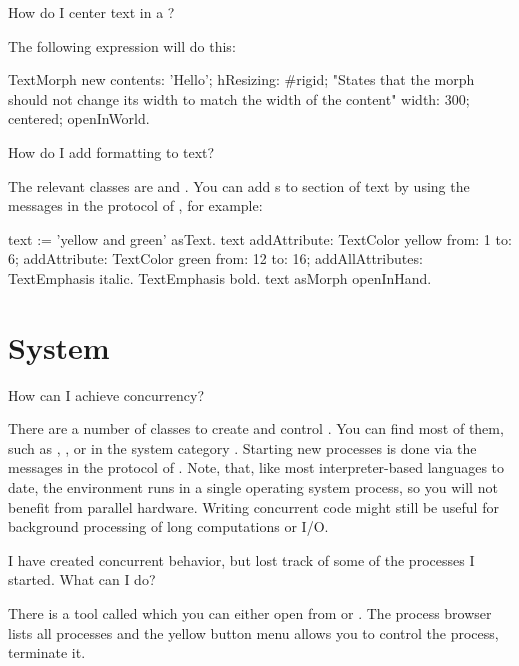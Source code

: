 \documentclass[a4paper,10pt,twoside]{book}
\begin{document}
\begin{faq}
How do I center text in a ?
\end{faq}
\answer
The following expression will do this:
\begin{code}{}
TextMorph new
    contents: 'Hello';
    hResizing: #rigid; "States that the morph should not change
                        its width to match the width of the content"
    width: 300;
    centered;
    openInWorld.
\end{code}

\begin{faq}
How do I add formatting to text?
\end{faq}
\answer
The relevant classes are  and .
You can add s to section of text by using the messages in the  protocol of , for example:
\begin{code}{}
text := 'yellow and green' asText.
text
	addAttribute: TextColor yellow from: 1 to: 6;
	addAttribute: TextColor green from: 12 to: 16;
	addAllAttributes: {TextEmphasis italic. TextEmphasis bold}.
text asMorph openInHand.
\end{code}

\section{System}

\begin{faq}
How can I achieve concurrency?
\end{faq}
\answer
There are a number of classes to create and control .
You can find most of them, such as , , or  in the system category .
Starting new processes is done via the messages in the  protocol of .
Note, that, like most interpreter-based languages to date, the \sq environment runs in a single operating system process, so you will not benefit from parallel hardware.
Writing concurrent code might still be useful for background processing of long computations or I/O.

\begin{faq}
I have created concurrent behavior, but lost track of some of the processes I started.
What can I do?
\end{faq}
\answer
There is a tool called  which you can either open from  or .
The process browser lists all processes and the yellow button menu allows you to control the process, \eg terminate it.
\end{document}
